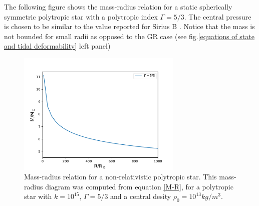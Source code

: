 The following figure shows the mass-radius relation for a static spherically symmetric polytropic star with a polytropic index $\Gamma=5/3$. The central pressure is chosen to be similar to the value reported for Sirius B \cite{Holberg_1998}. Notice that the mass is not bounded for small radii as opposed to the GR case (see fig.\ref{equations of state and tidal deformability} left panel)



\begin{figure}[hbt!]
\begin{center}
\includegraphics[width=0.7\textwidth, angle=0]{images/polytrope_own.pdf}
\captionsetup{width=.8\textwidth}
\caption[Mass-radius relation for a non-relativistic polytropic star]{Mass-radius relation for a non-relativistic polytropic star. This mass-radius diagram was computed from equation \ref{M-R}, for a polytropic star with $k=10^{15}$, $\Gamma=5/3$ and a central desity $\rho_0=10^{13}kg/m^3$.}
\label{polytropes1}
\end{center}
\end{figure}

\FloatBarrier

